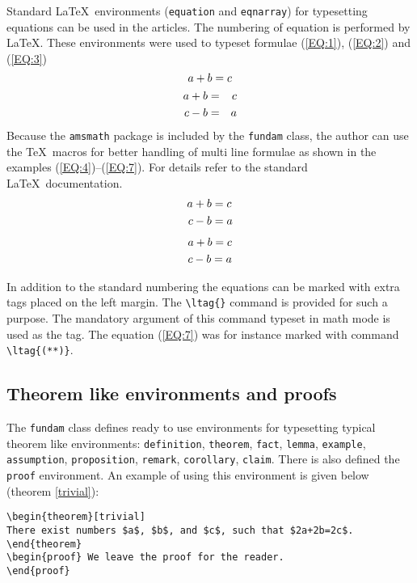 \documentclass{fundam}
\begin{document}
Standard \LaTeX\ environments (\texttt{equation} and
\texttt{eqnarray}) for typesetting equations can be used in the
articles. The numbering of equation is performed by
\LaTeX. These environments were used to typeset formulae (\ref{EQ:1}),
(\ref{EQ:2}) and (\ref{EQ:3})
\begin{equation}
\label{EQ:1}  a+b=c\ltag{*}
\end{equation}
\begin{eqnarray}
  a+b&=&c\ltag{(!)}\label{EQ:2}\\
  c-b&=&a\label{EQ:3}
\end{eqnarray}
Because the \texttt{amsmath} package is included by the
\texttt{fundam} class, the author can use the \AmS\TeX\ macros for
better handling of multi line formulae as shown in the examples
(\ref{EQ:4})--({\ref{EQ:7}}). For details refer to the standard
\AmS\LaTeX\ documentation.
\begin{align}
  a+b&=c\ltag{(a)}\label{EQ:4}\\
  c-b&=a\label{EQ:5}
\end{align}
\begin{gather}
  a+b=c\ltag{(*)}\label{EQ:6}\\
  c-b=a\ltag{(**)}\label{EQ:7}
\end{gather}

In addition to the standard numbering the equations can be marked with
extra tags placed on the left margin. The \verb|\ltag{}| command is
provided for such a purpose. The mandatory argument of this command
typeset in math mode is used as the tag. The equation (\ref{EQ:7}) was
for instance marked with command \verb|\ltag{(**)}|.

\subsection{Theorem like environments and proofs}

The \texttt{fundam} class defines ready to use environments for
typesetting typical theorem like environments: \texttt{definition},
\texttt{theorem}, \texttt{fact}, \texttt{lemma}, \texttt{example},
\texttt{assumption}, \texttt{proposition}, \texttt{remark},
\texttt{corollary}, \texttt{claim}. There is also defined the
\texttt{proof} environment. An example of using this environment is
given below (theorem \ref{trivial}):

\begin{verbatim}
\begin{theorem}[trivial]
There exist numbers $a$, $b$, and $c$, such that $2a+2b=2c$.
\end{theorem}
\begin{proof} We leave the proof for the reader.
\end{proof}
\end{verbatim}
\end{document}
